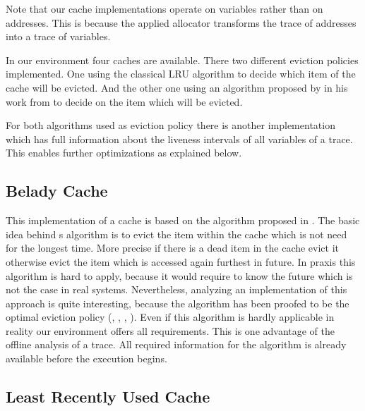 \documentclass[onecolumn, openright, master, english, signatures]{dbrgrptt}
\begin{document}
\begin{remark}
Note that our cache implementations operate on variables rather than on addresses. This is because the applied allocator transforms the \ac{trace} of addresses into a \ac{trace} of variables.
\end{remark}

In our environment four caches are available. There two different eviction policies implemented. One using the classical \ac{LRU} algorithm to decide which item of the cache will be evicted. And the other one using an algorithm proposed by  in his work \cite{belady1966study} from \citeyear{belady1966study} to decide on the item which will be evicted.

For both algorithms used as eviction policy there is another implementation which has full information about the liveness intervals of all variables of a \ac{trace}. This enables further optimizations as explained below.

\subsection{Belady Cache}\label{ssec:cache-belady}

This implementation of a cache is based on the algorithm proposed in \cite{belady1966study}. The basic idea behind \citeauthor{belady1966study}s algorithm is to evict the item within the cache which is not need for the longest time. More precise if there is a dead item in the cache evict it otherwise evict the item which is accessed again furthest in future. In praxis this algorithm is hard to apply, because it would require to know the future which is not the case in real systems. Nevertheless, analyzing an implementation of this approach is quite interesting, because the algorithm has been proofed to be the optimal eviction policy (\cite{mattson1970evaluation}, \cite{van2007short}, \cite{vogler2008another}, \cite{lee2016simple}). Even if this algorithm is hardly applicable in reality our environment offers all requirements. This is one advantage of the offline analysis of a \ac{trace}. All required information for the \citeauthor{belady1966study} algorithm is already available before the execution begins.

\subsection{Least Recently Used Cache}\label{ssec:cache-lru}
\end{document}

